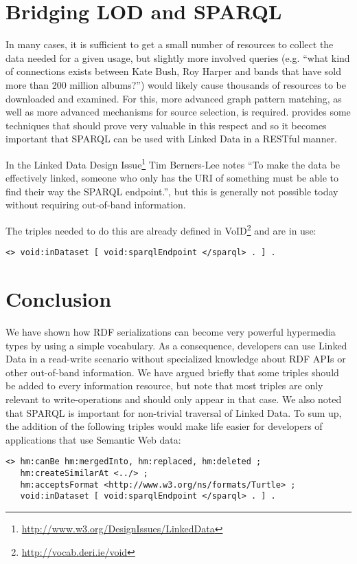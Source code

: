\documentclass{llncs}
\begin{document}
\section{Bridging LOD and SPARQL}

In many cases, it is sufficient to get a small number of resources to
collect the data needed for a given usage, but slightly more involved
queries (e.g. ``what kind of connections exists between Kate Bush, Roy
Harper and bands that have sold more than 200 million albums?'') would
likely cause thousands of resources to be downloaded and examined. For
this, more advanced graph pattern matching, as well as more advanced
mechanisms for source selection, is
required. \cite{springerlink:10.1007/978-3-642-25073-6-38} provides
some techniques that should prove very valuable in this respect and so
it becomes important that SPARQL can be used with Linked Data in a
RESTful manner.

In the Linked Data Design
Issue\footnote{\url{http://www.w3.org/DesignIssues/LinkedData}} Tim
Berners-Lee notes ``To make the data be effectively linked, someone
who only has the URI of something must be able to find their way the
SPARQL endpoint.'', but this is generally not possible today without
requiring out-of-band information.

The triples needed to do this are already defined in
VoID\footnote{\url{http://vocab.deri.ie/void}} and are in use:
\begin{verbatim}
<> void:inDataset [ void:sparqlEndpoint </sparql> . ] .
\end{verbatim}

\section{Conclusion}

We have shown how RDF serializations can become very powerful
hypermedia types by using a simple vocabulary. As a consequence,
developers can use Linked Data in a read-write scenario without
specialized knowledge about RDF APIs or other out-of-band
information. We have argued briefly that some triples should be added
to every information resource, but note that most triples are only
relevant to write-operations and should only appear in that case. We
also noted that SPARQL is important for non-trivial traversal of
Linked Data. To sum up, the addition of the following triples would
make life easier for developers of applications that use Semantic Web
data:

\begin{verbatim}
<> hm:canBe hm:mergedInto, hm:replaced, hm:deleted ;
   hm:createSimilarAt <../> ;
   hm:acceptsFormat <http://www.w3.org/ns/formats/Turtle> ;
   void:inDataset [ void:sparqlEndpoint </sparql> . ] .
\end{verbatim}


%
%

\end{document}

